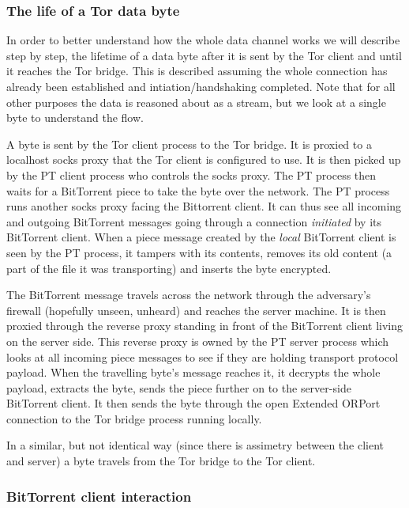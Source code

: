 \documentclass[11pt]{book} %
\begin{document}
\subsubsection{The life of a Tor data byte}

In order to better understand how the whole data channel works we will describe step by step, the lifetime of a data byte after it is sent by the Tor client and until it reaches the Tor bridge. This is described assuming the whole connection has already been established and intiation/handshaking completed. Note that for all other purposes the data is reasoned about as a stream, but we look at a single byte to understand the flow.

A byte is sent by the Tor client process to the Tor bridge. It is proxied to a localhost socks proxy that the Tor client is configured to use. It is then picked up by the PT client process who controls the socks proxy. The PT process then waits for a BitTorrent piece to take the byte over the network. The PT process runs another socks proxy facing the Bittorrent client. It can thus see all incoming and outgoing BitTorrent messages going through a connection \textit{initiated} by its BitTorrent client. When a piece message created by the \textit{local} BitTorrent client is seen by the PT process, it tampers with its contents, removes its old content (a part of the file it was transporting) and inserts the byte encrypted.  

The BitTorrent message travels across the network through the adversary's firewall (hopefully unseen, unheard) and reaches the server machine. It is then proxied through the reverse proxy standing in front of the BitTorrent client living on the server side. This reverse proxy is owned by the PT server process which looks at all incoming piece messages to see if they are holding transport protocol payload. When the travelling byte's message reaches it, it decrypts the whole payload, extracts the byte, sends the piece further on to the server-side BitTorrent client. It then sends the byte through the open Extended ORPort connection to the Tor bridge process running locally.

In a similar, but not identical way (since there is assimetry between the client and server) a byte travels from the Tor bridge to the Tor client.

\subsubsection{BitTorrent client interaction}
\end{document}
